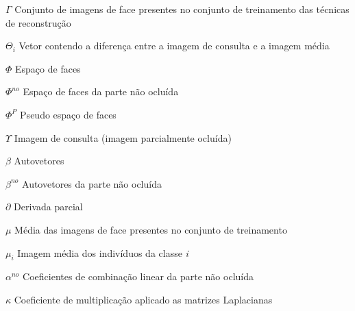 %
% 
\begin{simbolos}
\item[$\Gamma$] Conjunto de imagens de face presentes no conjunto de treinamento das técnicas de reconstrução
\item[$\Theta_i$] Vetor contendo a diferença entre a imagem de consulta e a imagem média
\item[$\Phi$] Espaço de faces
\item[$\Phi^{no}$] Espaço de faces da parte não ocluída
\item[$\Phi^{P}$] Pseudo espaço de faces
\item[$\Upsilon$] Imagem de consulta (imagem parcialmente ocluída)
\item[$\beta$] Autovetores
\item[$\beta^{no}$] Autovetores da parte não ocluída
\item[$\partial$] Derivada parcial
\item[$\mu$] Média das imagens de face presentes no conjunto de treinamento
\item[$\mu_i$] Imagem média dos indivíduos da classe \textit{i}
\item[$\alpha^{no}$] Coeficientes de combinação linear da parte não ocluída
\item[$\kappa$] Coeficiente de multiplicação aplicado as matrizes Laplacianas
\end{simbolos}



\tableofcontents* %
\cleardoublepage
\textual